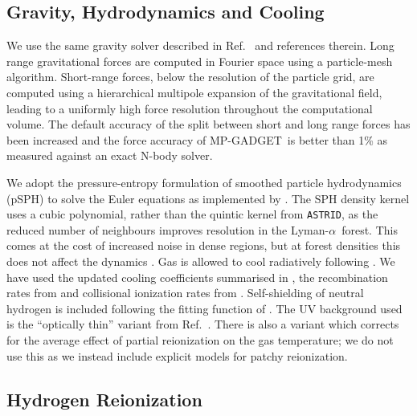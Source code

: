 \documentclass[a4paper,11pt]{article}
\newcommand{\Lya}{Lyman-$\alpha$}
\newcommand{\astrid}{\texttt{ASTRID}}
\newcommand{\mpgadget}{{\small MP-GADGET}}
\begin{document}
\subsection{Gravity, Hydrodynamics and Cooling}
\label{sec:gravity}

We use the same gravity solver described in Ref.~\cite{Bird:2022} and references therein. Long range gravitational forces are computed in Fourier space using a particle-mesh algorithm. Short-range forces, below the resolution of the particle grid, are computed using a hierarchical multipole expansion of the gravitational field, leading to a uniformly high force resolution throughout the computational volume. The default accuracy of the split between short and long range forces has been increased and the force accuracy of \mpgadget~is better than 1\% as measured against an exact N-body solver.

We adopt the pressure-entropy formulation of smoothed particle hydrodynamics (pSPH) to solve the Euler equations \citep{Hopkins:2013,Read:2010} as implemented by \cite{Feng:2014}. %
The SPH density kernel uses a cubic polynomial, rather than the quintic kernel from \astrid, as the reduced number of neighbours improves resolution in the \Lya~forest. This comes at the cost of increased noise in dense regions, but at forest densities this does not affect the dynamics \cite{Bird:2013}.
Gas is allowed to cool radiatively following \citep{Katz:1996}.
We have used the updated cooling coefficients summarised in \cite{Bolton:2017}, the recombination rates from \cite{Verner:1996} and collisional ionization rates from \cite{Voronov:1997}. Self-shielding of neutral hydrogen is included following the fitting function of \cite{Rahmati:2013}.
The UV background used is the ``optically thin'' variant from Ref.~\cite{FG2020}. There is also a variant which corrects for the average effect of partial reionization on the gas temperature; we do not use this as we instead include explicit models for patchy reionization.

\subsection{Hydrogen Reionization}
\label{sec:hydrogen}
\end{document}
